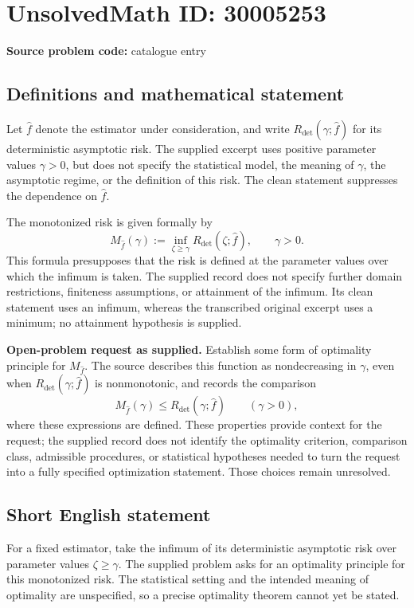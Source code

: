\documentclass[11pt]{article}
\begin{document}
\section*{UnsolvedMath ID: 30005253}
\textbf{Source problem code:} catalogue entry
\subsection{Definitions and mathematical statement}
Let \(\widehat f\) denote the estimator under consideration, and write \(R_{\mathrm{det}}(\gamma;\widehat f)\) for its deterministic asymptotic risk. The supplied excerpt uses positive parameter values \(\gamma>0\), but does not specify the statistical model, the meaning of \(\gamma\), the asymptotic regime, or the definition of this risk. The clean statement suppresses the dependence on \(\widehat f\).

The monotonized risk is given formally by
\[
M_{\widehat f}(\gamma)
:=\inf_{\zeta\geq\gamma}R_{\mathrm{det}}(\zeta;\widehat f),
\qquad \gamma>0.
\]
This formula presupposes that the risk is defined at the parameter values over which the infimum is taken. The supplied record does not specify further domain restrictions, finiteness assumptions, or attainment of the infimum. Its clean statement uses an infimum, whereas the transcribed original excerpt uses a minimum; no attainment hypothesis is supplied.

\textbf{Open-problem request as supplied.} Establish some form of optimality principle for \(M_{\widehat f}\). The source describes this function as nondecreasing in \(\gamma\), even when \(R_{\mathrm{det}}(\gamma;\widehat f)\) is nonmonotonic, and records the comparison
\[
M_{\widehat f}(\gamma)\leq R_{\mathrm{det}}(\gamma;\widehat f)
\qquad (\gamma>0),
\]
where these expressions are defined. These properties provide context for the request; the supplied record does not identify the optimality criterion, comparison class, admissible procedures, or statistical hypotheses needed to turn the request into a fully specified optimization statement. Those choices remain unresolved.
\subsection{Short English statement}
For a fixed estimator, take the infimum of its deterministic asymptotic risk over parameter values \(\zeta\geq\gamma\). The supplied problem asks for an optimality principle for this monotonized risk. The statistical setting and the intended meaning of optimality are unspecified, so a precise optimality theorem cannot yet be stated.
\end{document}
